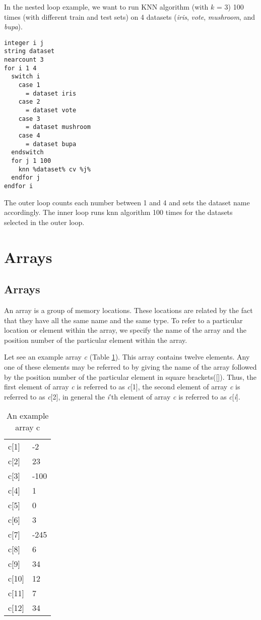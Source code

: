 \documentclass[a4paper,12pt]{book}
\begin{document}
In the nested loop example, we want to run KNN algorithm (with $k$ = 3) 100 times (with different train and test sets) on 4 datasets ({\em iris}, {\em vote}, {\em mushroom}, and {\em bupa}).
\begin{verbatim}
integer i j
string dataset
nearcount 3
for i 1 4
  switch i
    case 1
      = dataset iris
    case 2
      = dataset vote
    case 3
      = dataset mushroom
    case 4
      = dataset bupa
  endswitch
  for j 1 100
    knn %dataset% cv %j%
  endfor j
endfor i
\end{verbatim}
The outer loop counts each number between 1 and 4 and sets the dataset name accordingly. The inner loop runs knn algorithm 100 times for the datasets selected in the outer loop.

\section{Arrays}

\subsection{Arrays}
An array is a  group of memory locations. These locations are related by the fact
that they have all the same name and the same type. To refer to a particular location
or element within the array, we specify the name of the array and the position number
of the particular element within the array.

Let see an example array \textsl{c} (Table \ref{ex-array}). This array contains twelve
elements. Any one of these elements may be referred to by giving the name of the array
followed by the position number of the particular element in square brackets([]).
Thus, the first element of array \textsl{c} is referred to as \textsl{c}[1], the second element of array \textsl{c} is referred to as \textsl{c}[2], in general the \textsl{i}'th element of array \textsl{c} is referred to as \textsl{c}[\textsl{i}].

\begin{table}[ht]
\begin{center}
\caption{An example array c}
\label{ex-array}
\begin{tabular}{ll}
\hline
c[1] & -2 \\
c[2] & 23 \\
c[3] & -100 \\
c[4] & 1 \\
c[5] & 0 \\
c[6] & 3 \\
c[7] & -245 \\
c[8] & 6 \\
c[9] & 34 \\
c[10] & 12 \\
c[11] & 7 \\
c[12] & 34 \\
\hline
\end{tabular}
\end{center}
\end{table}
\end{document}
